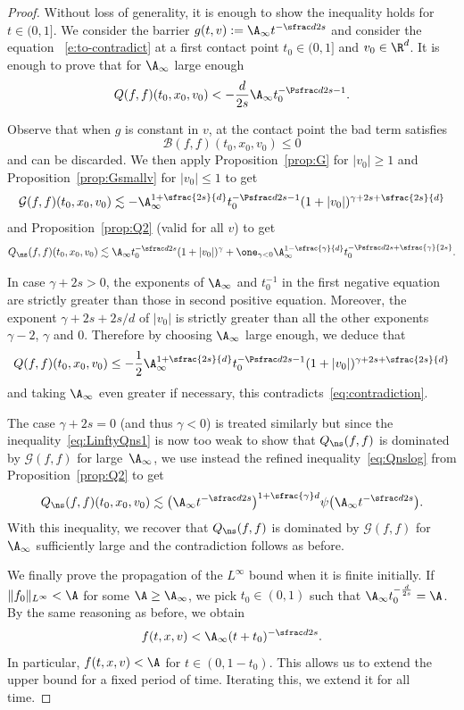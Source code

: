 \begin{proof}
Without loss of generality, it is enough to show the inequality holds
for $t \in (0,1]$. We consider the barrier
$g(t,v) := \A_\infty t^{-\sfrac d {2s}}$ and consider the equation
~\eqref{e:to-contradict} at a first contact point $t_0 \in (0,1]$ and
$v_0 \in \R^d$. It is enough to prove that
for $\A_\infty$ large enough
\begin{equation}\label{eq:contradiction}
Q(f,f)(t_0,x_0,v_0) < -\frac d {2s} \A_\infty t_0^{-\Psfrac d {2s}-1}.
\end{equation}

Observe that when $g$ is constant in $v$, at the contact point the bad
term satisfies
\[
\mathcal{B}(f,f)(t_0,x_0,v_0) \le 0
\]
and can be discarded. We then apply Proposition~\ref{prop:G} for
$|v_0| \ge 1$ and Proposition~\ref{prop:Gsmallv} for $|v_0| \le 1$ to
get
\begin{equation*}
\mathcal G(f,f)(t_0,x_0,v_0) \lesssim - \A_\infty^{1+\sfrac{2s}{d}} t_0^{-\Psfrac d {2s}-1}
(1+|v_0|)^{\gamma+2s +\sfrac{2s}{d}}
\end{equation*}
and Proposition~\ref{prop:Q2} (valid for all $v$) to get
\begin{equation}\label{eq:LinftyQns1}
Q_{\ns}(f,f)(t_0,x_0,v_0) \lesssim \A_\infty t_0^{-\sfrac d {2s}}(1+|v_0|)^{\gamma} +
\one_{\gamma <0} \A_\infty^{1-\sfrac{\gamma}{d}} t_0^{-\Psfrac d {2s}+\sfrac{\gamma}{2s}}.
\end{equation}

In case $\gamma + 2s > 0$, the exponents of $\A_\infty$ and $t_0^{-1}$
in the first negative equation are strictly greater than those
in second positive equation. Moreover, the exponent
$\gamma+2s+2s/d$ of $|v_0|$ is strictly greater than all the other
exponents $\gamma-2$, $\gamma$ and $0$. Therefore by choosing
$\A_\infty$ large enough, we deduce that
\[
Q(f,f)(t_0,x_0,v_0) \le - \frac12 \A_\infty^{1+\sfrac{2s}{d}}
t_0^{-\Psfrac d {2s}-1} (1+|v_0|)^{\gamma+2s +\sfrac{2s}{d}}
\]
and taking $\A_\infty$ even greater if necessary, this
contradicts~\eqref{eq:contradiction}.

The case $\gamma+2s=0$ (and thus $\gamma <0$) is treated similarly but
since the inequality~\eqref{eq:LinftyQns1} is now too weak to show
that $Q_{\ns}(f,f)$ is dominated by $\mathcal{G}(f,f)$ for large~$\A_\infty$, we use instead the refined inequality~\eqref{eq:Qnslog}
from Proposition~\ref{prop:Q2} to get
\[
Q_{\ns}(f,f)(t_0,x_0,v_0) \lesssim \bigl( \A_\infty t^{-\sfrac d {2s}}
\bigr)^{1+\sfrac{\gamma}d} \psi \bigl( \A_\infty t^{-\sfrac d
{2s}} \bigr).
\]
With this inequality, we recover that $Q_{\ns}(f,f)$ is dominated by
$\mathcal{G}(f,f)$ for $\A_\infty$ sufficiently large and the
contradiction follows as before.

We finally prove the propagation of the $L^\infty$ bound when it is finite
initially. If $\|f_0\|_{L^\infty} < \A$ for some $\A \geq \A_\infty$,
we pick $t_0 \in (0,1)$ such that
$\A_\infty t_0^{-\frac d {2s}} = \A$. By the same reasoning as before,
we obtain
\[ f(t,x,v) < \A_\infty (t+t_0)^{-\sfrac d {2s}}.\] In particular,
$f(t,x,v) < \A$ for $t \in (0,1-t_0)$. This allows us to extend the
upper bound for a fixed period of time. Iterating this, we extend it
for all time.
\end{proof}

